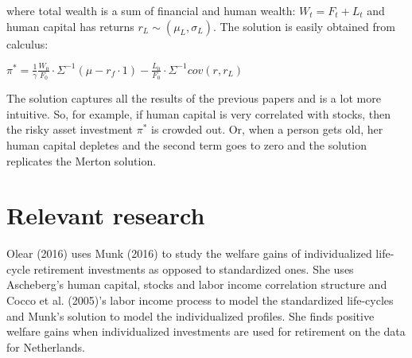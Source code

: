 where total wealth is a sum of financial and human wealth: $W_t = F_t + L_t$ and human capital has returns $r_L \sim (\mu_L, \sigma_L)$. The solution is easily obtained from calculus:

\begin{center}
	$\pi^* = \frac{1}{\gamma} \frac{W_0}{F_0} \cdot \Sigma^{-1} (\mu - r_f \cdot 1) - \frac{L_0}{F_0} \cdot \Sigma^{-1} cov(r,r_L)$
\end{center}

The solution captures all the results of the previous papers and is a lot more intuitive. So, for example, if human capital is very correlated with stocks, then the risky asset investment $\pi^*$ is crowded out. Or, when a person gets old, her human capital depletes and the second term goes to zero and the solution replicates the Merton solution.


\section{Relevant research}
Olear (2016) uses Munk (2016) to study the welfare gains of individualized life-cycle retirement investments as opposed to standardized ones. She uses Ascheberg's human capital, stocks and labor income correlation structure and Cocco et al. (2005)'s labor income process to model the standardized life-cycles and Munk's solution to model the individualized profiles. She finds positive welfare gains when individualized investments are used for retirement on the data for Netherlands.
